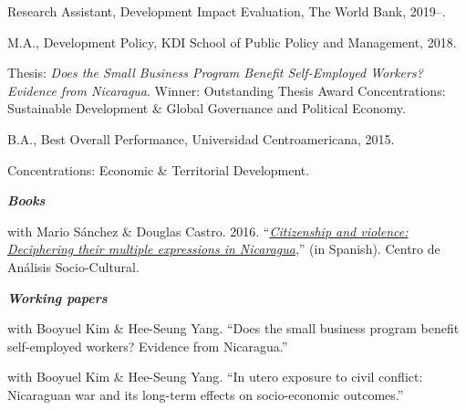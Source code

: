 \documentclass[11pt,article,oneside, a4paper]{memoir}
\begin{document}
\ind Research Assistant, Development Impact Evaluation, The World Bank, 2019--.

\medskip

\ind M.A., Development Policy, KDI School of Public Policy and Management, 2018. 

\ind \hspace{0.35in} \footnotesize Thesis: \emph{Does the Small Business Program Benefit Self-Employed Workers? Evidence from Nicaragua}. \newline Winner: Outstanding Thesis Award \newline Concentrations: Sustainable Development \& Global Governance and Political Economy. \normalsize \vspace{0.01in}

\ind B.A., Best Overall Performance, Universidad Centroamericana, 2015.

\ind \hspace{0.35in} \footnotesize Concentrations: Economic \& Territorial Development. \normalsize \vspace{0.01in}

\medskip

\noindent\emph{\textbf{Books} \vspace{0.01in}}

\ind with Mario Sánchez \& Douglas Castro. 2016. ``\emph{\href{http://biblioteca.clacso.edu.ar/Nicaragua/casc-uca/20150313124733/Ciudadania-y-violencia.pdf}{Citizenship and violence: Deciphering their multiple expressions in Nicaragua}},'' (in Spanish). Centro de Análisis Socio-Cultural. \vspace{0.05in} \normalsize

\medskip
\noindent\emph{\textbf{Working papers} \vspace{0.05in}}

\ind with Booyuel Kim \& Hee-Seung Yang. ``Does the small business program benefit self-employed workers? Evidence from Nicaragua.''

\ind with Booyuel Kim \& Hee-Seung Yang. ``In utero exposure to civil conflict: Nicaraguan war and its long-term effects on socio-economic outcomes.''
\end{document}
